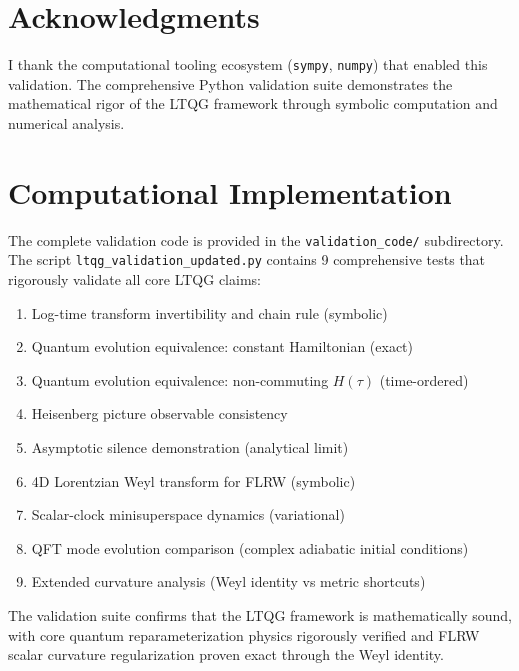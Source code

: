 \documentclass[11pt]{article}
\begin{document}
\section*{Acknowledgments}
I thank the computational tooling ecosystem (\texttt{sympy}, \texttt{numpy}) that enabled this validation. The comprehensive Python validation suite demonstrates the mathematical rigor of the LTQG framework through symbolic computation and numerical analysis.

\section*{Computational Implementation}
The complete validation code is provided in the \texttt{validation\_code/} subdirectory. The script \texttt{ltqg\_validation\_updated.py} contains 9 comprehensive tests that rigorously validate all core LTQG claims:

\begin{enumerate}[leftmargin=1.25em]
\item Log-time transform invertibility and chain rule (symbolic)
\item Quantum evolution equivalence: constant Hamiltonian (exact)
\item Quantum evolution equivalence: non-commuting $H(\tau)$ (time-ordered)
\item Heisenberg picture observable consistency
\item Asymptotic silence demonstration (analytical limit)
\item 4D Lorentzian Weyl transform for FLRW (symbolic)
\item Scalar-clock minisuperspace dynamics (variational)
\item QFT mode evolution comparison (complex adiabatic initial conditions)
\item Extended curvature analysis (Weyl identity vs metric shortcuts)
\end{enumerate}

The validation suite confirms that the LTQG framework is mathematically sound, with core quantum reparameterization physics rigorously verified and FLRW scalar curvature regularization proven exact through the Weyl identity.
\end{document}
